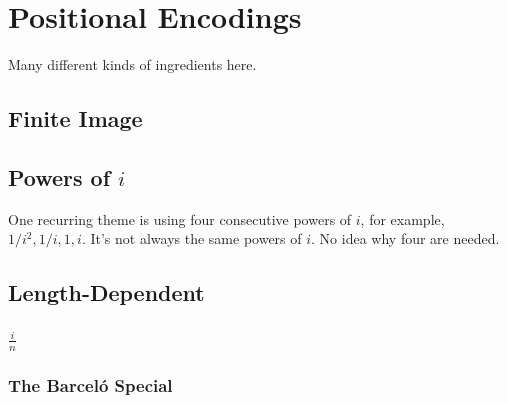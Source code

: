 %
\chapter{Positional Encodings}
%

Many different kinds of ingredients here.

\section{Finite Image}

\section{Powers of $i$}

One recurring theme is using four consecutive powers of $i$, for example, $1/i^2, 1/i, 1, i$. It's not always the same powers of $i$. No idea why four are needed.

\section{Length-Dependent}

\subsection{$\frac{i}{n}$}

\subsection{The Barceló Special}

